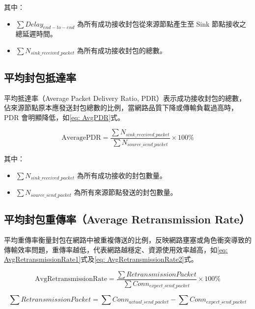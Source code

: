 \begin{ZhChapter}
其中：
\begin{itemize}
    \item $\sum Delay_{end-to-end}$ 為所有成功接收封包從來源節點產生至 Sink 節點接收之總延遲時間。
    \item $\sum N_{sink\_received\_packet}$ 為所有成功接收封包的總數。
\end{itemize}

\subsection{平均封包抵達率}

平均抵達率（Average Packet Delivery Ratio, PDR）表示成功接收封包的總數，佔來源節點原本應發送封包總數的比例，當網路品質下降或傳輸負載過高時，PDR 會明顯降低，如\ref{eq: AvgPDR}式。

\begin{equation}
\label{eq: AvgPDR}
\text{AveragePDR} = \frac{\sum N_{sink\_received\_packet}}{\sum N_{source\_send\_packet}} \times 100\%
\end{equation}

其中：
\begin{itemize}
    \item $\sum N_{sink\_received\_packet}$ 為所有成功接收的封包數量。
    \item $\sum N_{source\_send\_packet}$ 為所有來源節點發送的封包數量。
\end{itemize}

\subsection{平均封包重傳率（Average Retransmission Rate）}

平均重傳率衡量封包在網路中被重複傳送的比例，反映網路壅塞或角色衝突導致的傳輸效率問題，重傳率越低，代表網路越穩定、資源使用效率越高，如\ref{eq: AvgRetransmissionRate1}式及\ref{eq: AvgRetransmissionRate2}式。

\begin{equation}
\label{eq: AvgRetransmissionRate1}
\text{AvgRetransmissionRate} = \frac{\sum RetransmissionPacket}{\sum Conn_{expect\_send\_packet}} \times 100\%
\end{equation}

\begin{equation}
\label{eq: AvgRetransmissionRate2}
\sum RetransmissionPacket = \sum Conn_{actual\_send\_packet} - \sum Conn_{expect\_send\_packet}
\end{equation}


\end{ZhChapter}
